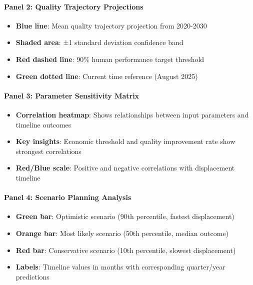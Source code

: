 \documentclass[12pt,a4paper]{article}
\begin{document}
{{{{{\hypertarget{panel-2-quality-trajectory-projections}{%
\paragraph{Panel 2: Quality Trajectory Projections}\label{panel-2-quality-trajectory-projections}}

\begin{itemize}
\item \textbf{Blue line}: Mean quality trajectory projection from 2020-2030
\item \textbf{Shaded area}: ±1 standard deviation confidence band
\item \textbf{Red dashed line}: 90\% human performance target threshold
\item \textbf{Green dotted line}: Current time reference (August 2025)
\end{itemize}

\hypertarget{panel-3-parameter-sensitivity-matrix}{%
\paragraph{Panel 3: Parameter Sensitivity Matrix}\label{panel-3-parameter-sensitivity-matrix}}

\begin{itemize}
\item \textbf{Correlation heatmap}: Shows relationships between input parameters and timeline outcomes
\item \textbf{Key insights}: Economic threshold and quality improvement rate show strongest correlations
\item \textbf{Red/Blue scale}: Positive and negative correlations with displacement timeline
\end{itemize}

\hypertarget{panel-4-scenario-planning-analysis}{%
\paragraph{Panel 4: Scenario Planning Analysis}\label{panel-4-scenario-planning-analysis}}

\begin{itemize}
\item \textbf{Green bar}: Optimistic scenario (90th percentile, fastest displacement)
\item \textbf{Orange bar}: Most likely scenario (50th percentile, median outcome)
\item \textbf{Red bar}: Conservative scenario (10th percentile, slowest displacement)
\item \textbf{Labels}: Timeline values in months with corresponding quarter/year predictions
\end{itemize}

}}}}}
\end{document}
